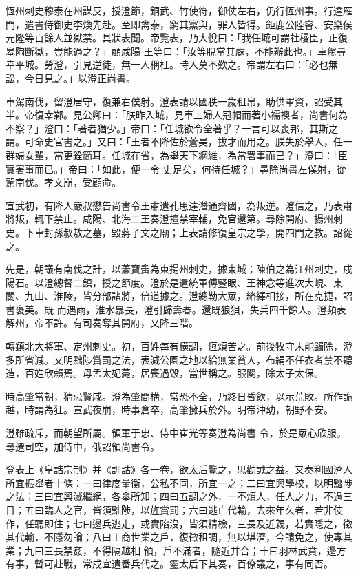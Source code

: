 \begin{pinyinscope}
 恆州刺史穆泰在州謀反，授澄節，銅武、竹使符，御仗左右，仍行恆州事。行達雁門，遣書侍御史李煥先赴。至即禽泰，窮其黨與，罪人皆得。鉅鹿公陸睿、安樂侯元隆等百餘人並獄禁。具狀表聞。帝覽表，乃大悅曰：「我任城可謂社稷臣，正復皋陶斷獄，豈能過之？」顧咸陽
 王等曰：「汝等脫當其處，不能辦此也。」車駕尋幸平城。勞澄，引見逆徒，無一人稱枉。時人莫不歎之。帝謂左右曰：「必也無訟，今日見之。」以澄正尚書。



 車駕南伐，留澄居守，復兼右僕射。澄表請以國秩一歲租帛，助供軍資，詔受其半。帝復幸鄴。見公卿曰：「朕昨入城，見車上婦人冠帽而著小襦襖者，尚書何為不察？」澄曰：「著者猶少。」帝曰：「任城欲令全著乎？一言可以喪邦，其斯之謂。可命史官書之。」又曰：「王者不降佐於蒼昊，拔才而用之。朕失於舉人，任一群婦女輩，當更銓簡耳。任城在省，為舉天下綱維，為當署事而已？」澄曰：「臣實署事而已。」帝曰：「如此，便一令
 史足矣，何待任城？」尋除尚書左僕射，從駕南伐。孝文崩，受顧命。



 宣武初，有降人嚴叔懋告尚書令王肅遣孔思達潛通齊國，為叛逆。澄信之，乃表肅將叛，輒下禁止。咸陽、北海二王奏澄擅禁宰輔，免官還第。尋除開府、揚州刺史。下車封孫叔敖之墓，毀蔣子文之廟；上表請修復皇宗之學，開四門之教。詔從之。



 先是，朝議有南伐之計，以蕭寶夤為東揚州刺史，據東城；陳伯之為江州刺史，戍陽石。以澄總督二鎮，授之節度。澄於是遣統軍傅豎眼、王神念等進次大峴、東關、九山、淮陵，皆分部諸將，倍道據之。澄總勒大眾，絡繹相接，所在克捷，詔書褒美。既
 而遇雨，淮水暴長，澄引歸壽春。還既狼狽，失兵四千餘人。澄頻表解州，帝不許。有司奏奪其開府，又降三階。



 轉鎮北大將軍、定州刺史。初，百姓每有橫調，恆煩苦之。前後牧守未能蠲除，澄多所省減。又明黜陟賞罰之法，表減公園之地以給無業貧人，布絹不任衣者禁不聽造，百姓欣賴焉。母孟太妃薨，居喪過毀，當世稱之。服闋，除太子太保。



 時高肇當朝，猜忌賢戚。澄為肇間構，常恐不全，乃終日昏飲，以示荒敗。所作詭越，時謂為狂。宣武夜崩，時事倉卒，高肇擁兵於外。明帝沖幼，朝野不安。



 澄雖疏斥，而朝望所屬。領軍于忠、侍中崔光等奏澄為尚書
 令，於是眾心欣服。尋遷司空，加侍中，俄詔領尚書令。



 登表上《皇誥宗制》并《訓詁》各一卷，欲太后覽之，思勸誡之益。又奏利國濟人所宜振舉者十條：一曰律度量衡，公私不同，所宜一之；二曰宜興學校，以明黜陟之法；三曰宜興滅繼絕，各舉所知；四曰五調之外，一不煩人，任人之力，不過三日；五曰臨人之官，皆須黜陟，以旌賞罰；六曰逃亡代輸，去來年久者，若非伎作，任聽即住；七曰邊兵逃走，或實陷沒，皆須精檢，三長及近親，若實隱之，徵其代輸，不隱勿論；八曰工商世業之戶，復徵租調，無以堪濟，今請免之，使專其業；九曰三長禁姦，不得隔越相
 領，戶不滿者，隨近并合；十曰羽林武賁，邊方有事，暫可赴戰，常戍宜遣番兵代之。靈太后下其奏，百僚議之，事有同否。




\end{pinyinscope}
